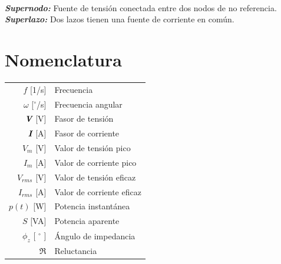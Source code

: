 \documentclass[11pt,a4paper,twocolumn]{article}
\newcommand{\fasor}[1]{\textit{\textbf{#1}}}
\begin{document}
\begin{tcolorbox}[colback=white!97!brown, colframe=brown!15!gray]
\begin{tabular}{r l}
	\end{tabular} \\

		
			
		
%	
%
		
	\textbf{\textsl{Supernodo: }} Fuente de tensión conectada entre dos nodos de no referencia. \\
	\textbf{\textsl{Superlazo: }} Dos lazos tienen una fuente de corriente en común.	
		
	
	
	
	\end{tcolorbox}

\newpage

\pagestyle{fancy}

\section*{Nomenclatura}
\begin{tabular}{r l}
	$f$ [1/s] & Frecuencia \\
	$\omega $ [$^{\circ}$/s] & Frecuencia angular \\
	$\fasor{V}$ [V]& Fasor de tensión \\
	$\fasor{I}$ [A]& Fasor de corriente \\
	$V_{m}$ [V] & Valor de tensión pico\\
	$I_{m}$ [A] & Valor de corriente pico \\
	$V_{rms}$ [V] & Valor de tensión eficaz\\
	$I_{rms}$ [A] & Valor de corriente eficaz \\
	$p(t)$ [W] & Potencia instantánea \\
	$S$ [VA] & Potencia aparente \\
	$\phi_{z}$ [ $^\circ$ ]& Ángulo de impedancia \\
	$\Re$ & Reluctancia\\
	
	
	
\end{tabular}
\end{document}
